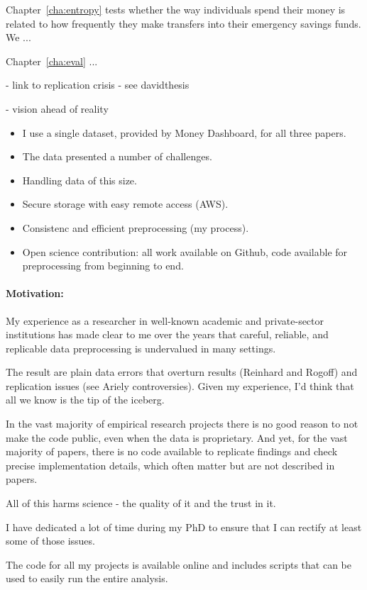 Chapter~\ref{cha:entropy} tests whether the way individuals spend their money
is related to how frequently they make transfers into their emergency savings
funds. We ...

Chapter~\ref{cha:eval} ...









- link to replication crisis - see davidthesis


- vision ahead of reality

\begin{itemize}
    \item I use a single dataset, provided by Money Dashboard, for all three
        papers.

    \item The data presented a number of challenges.

    \item Handling data of this size.

    \item Secure storage with easy remote access (AWS).

    \item Consistenc and efficient preprocessing (my process).

    \item Open science contribution: all work available on Github, code
        available for preprocessing from beginning to end.
\end{itemize}

\paragraph{Motivation:}%
\label{par:motivation_}

My experience as a researcher in well-known academic and private-sector
institutions has made clear to me over the years that careful, reliable, and
replicable data preprocessing is undervalued in many settings.

The result are plain data errors that overturn results (Reinhard and Rogoff)
and replication issues (see Ariely controversies). Given my experience, I'd
think that all we know is the tip of the iceberg.

In the vast majority of empirical research projects there is no good reason to
not make the code public, even when the data is proprietary. And yet, for the
vast majority of papers, there is no code available to replicate findings and
check precise implementation details, which often matter but are not described
in papers.

All of this harms science - the quality of it and the trust in it.

I have dedicated a lot of time during my PhD to ensure that I can rectify at
least some of those issues.

The code for all my projects is available online and includes scripts that can
be used to easily run the entire analysis.

